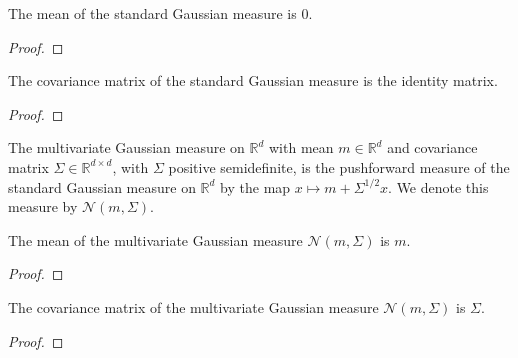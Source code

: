 \begin{lemma}\label{lem:integral_id_stdGaussian}
The mean of the standard Gaussian measure is $0$.
\end{lemma}

\begin{proof}

\end{proof}


\begin{lemma}\label{lem:covMatrix_stdGaussian}
The covariance matrix of the standard Gaussian measure is the identity matrix.
\end{lemma}

\begin{proof}

\end{proof}


\begin{definition}\label{def:multivariateGaussian}
  \leanok
The multivariate Gaussian measure on $\mathbb{R}^d$ with mean $m \in \mathbb{R}^d$ and covariance matrix $\Sigma \in \mathbb{R}^{d \times d}$, with $\Sigma$ positive semidefinite, is the pushforward measure of the standard Gaussian measure on $\mathbb{R}^d$ by the map $x \mapsto m + \Sigma^{1/2} x$.
We denote this measure by $\mathcal{N}(m, \Sigma)$.
\end{definition}


\begin{lemma}\label{lem:integral_id_multivariateGaussian}
The mean of the multivariate Gaussian measure $\mathcal{N}(m, \Sigma)$ is $m$.
\end{lemma}

\begin{proof}

\end{proof}


\begin{lemma}\label{lem:covMatrix_multivariateGaussian}
The covariance matrix of the multivariate Gaussian measure $\mathcal{N}(m, \Sigma)$ is $\Sigma$.
\end{lemma}

\begin{proof}

\end{proof}


